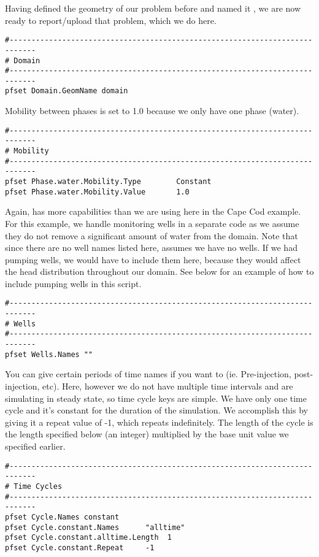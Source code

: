 Having defined the geometry of our problem before and named it , we are
now ready to report/upload that problem, which we do here.

\begin{verbatim}
#----------------------------------------------------------------------------
# Domain
#----------------------------------------------------------------------------
pfset Domain.GeomName domain
\end{verbatim}

Mobility between phases is set to 1.0 because we only have one phase (water).

\begin{verbatim}
#----------------------------------------------------------------------------
# Mobility
#----------------------------------------------------------------------------
pfset Phase.water.Mobility.Type        Constant
pfset Phase.water.Mobility.Value       1.0
\end{verbatim}

Again, \parflow{} has more capabilities than we are using here in the Cape Cod example. 
For this example, we handle monitoring wells in a separate code as we assume they
do not remove a significant amount of water from the domain.  Note that since 
there are no well names listed here, \parflow{} assumes we have no wells. 
If we had pumping wells, we would have to include them here, because they 
would affect the head distribution throughout our domain.  See below for an example of how to 
include pumping wells in this script.

\begin{verbatim}
#----------------------------------------------------------------------------
# Wells
#----------------------------------------------------------------------------
pfset Wells.Names ""
\end{verbatim}

You can give certain periods of time names if you want to (ie. Pre-injection, post-injection, etc).  
Here, however we do not have multiple time intervals and are simulating in steady state, so time cycle 
keys are simple.  We have only one time cycle and it's constant for the duration of the simulation. 
We accomplish this by giving it a repeat value of -1, which repeats indefinitely.  The length of 
the cycle is the length specified below (an integer) multiplied by the base unit value we specified earlier.

\begin{verbatim}
#----------------------------------------------------------------------------
# Time Cycles
#----------------------------------------------------------------------------
pfset Cycle.Names constant
pfset Cycle.constant.Names		"alltime"
pfset Cycle.constant.alltime.Length	 1
pfset Cycle.constant.Repeat		-1
\end{verbatim}

